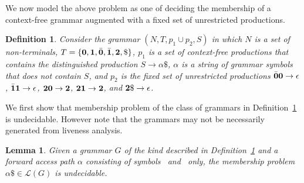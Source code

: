 \documentclass[preprint, 9pt]{sigplanconf}
\newtheorem{proposition}[theorem]{Proposition}
\newtheorem{definition}[theorem]{Definition}
\newtheorem{lemma}[theorem]{Lemma}
\begin{document}
We now model  the above problem as one  of deciding the
membership of  a context-free grammar augmented  with a
fixed set of unrestricted productions.

\begin{definition}\label{def:specialgrammar}
Consider the  grammar $(N,T,  p_1\cup p_2,S)$  in which
$N$ is  a set  of non-terminals,  $T =  \{\mathbf{0}, \mathbf{1},
\bar{\mathbf{0}},  \bar{\mathbf{1}},  {\mathbf{2}},  \$\}$,   $p_1$  is  a  set  of
context-free    productions     that    contains    the
distinguished  production   $S  \rightarrow  \alpha\$$,
$\alpha$ is a  string of grammar symbols  that does not
contain $S$, and $p_2$ is the fixed set of unrestricted
productions    $\bar{\mathbf{0}}\mathbf{0}    \rightarrow    \epsilon$,
$\bar{\mathbf{1}}\mathbf{1}    \rightarrow   \epsilon$,    ${\mathbf{2}}\mathbf{0}
\rightarrow {\mathbf{2}}$,  ${\mathbf{2}}\mathbf{1} \rightarrow {\mathbf{2}}$,
and ${\mathbf{2}}\$ \rightarrow \epsilon$.
\end{definition}

We first show that membership problem of the class of grammars in
Definition~\ref{def:specialgrammar} is undecidable. However note that
the grammars may not be necessarily generated from liveness analysis.
\newcommand{\state}{\ensuremath{\mathsf{S}}}
\newcommand{\nont}[2]{\ensuremath{\mathsf{S}_{#1}^{#2}}}  
\begin{lemma}\label{lemma:grammar-undecidable}
Given a grammar    $G$    of   the    kind    described    in
Definition~\ref{def:specialgrammar}  and a forward access path $\alpha$
consisting  of symbols \acar\  and \acdr\  only, the membership problem
$\alpha\$ \in \mathscr{L}(G)$ is undecidable.
\end{lemma} 
\end{document}
